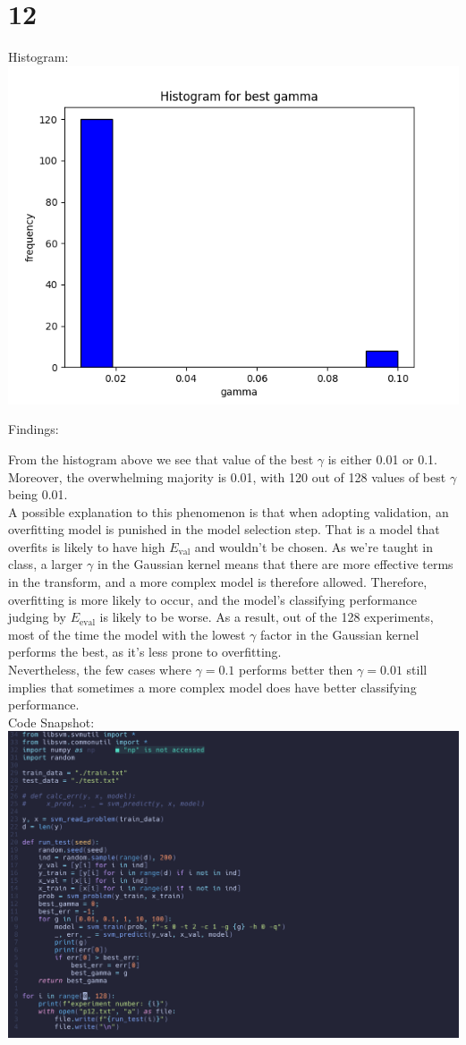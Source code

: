 \documentclass[11pt]{article}
\theoremstyle{definition}
\begin{document}
\section*{12}
Histogram: \\ 
\includegraphics[width = \textwidth]{p12_fig.png} \\
\par 
Findings: \\ 
\par
From the histogram above we see that value of the best $\gamma$ is either 0.01 or 0.1. Moreover, the overwhelming majority is 0.01, with 120 out of 128 values of best $\gamma$ being 0.01. \\ 
A possible explanation to this phenomenon is that when adopting validation, an overfitting model is punished in the model selection step. That is a model that overfits is likely to have high $E_\text{val}$ and wouldn't be chosen. As we're taught in class, a larger $\gamma$ in the Gaussian kernel means that there are more effective terms in the transform, and a more complex model is therefore allowed. Therefore, overfitting is more likely to occur, and the model's classifying performance judging by $E_\text{eval}$ is likely to be worse. As a result, out of the 128 experiments, most of the time the model with the lowest $\gamma$ factor in the Gaussian kernel performs the best, as it's less prone to overfitting. \\ 
Nevertheless, the few cases where $\gamma = 0.1$ performs better then $\gamma = 0.01$ still implies that sometimes a more complex model does have better classifying performance. \\
Code Snapshot: \\ 
\includegraphics[width = \textwidth]{p12.png}
\end{document}
